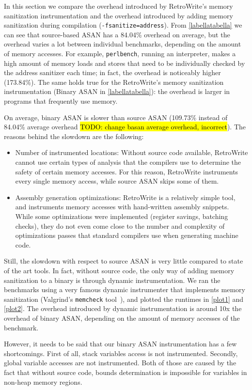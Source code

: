 \documentclass[a4paper,11pt,oneside]{report}
\newcommand{\sysname}{RetroWrite\xspace}
\DeclareRobustCommand{\todo}[1]{{\sethlcolor{cyan}\hl{TODO: #1}}}
\begin{document}
In this section we compare the overhead introduced by \sysname's memory
sanitization instrumentation and the overhead introduced by adding memory
sanitization during compilation (\texttt{-fsanitize=address}).  From
\autoref{labellatabella} we can see that source-based ASAN has a 84.04\%
overhead on average, but the overhead varies a lot between individual
benchmarks, depending on the amount of memory accesses. For example,
\texttt{perlbench}, running an interpreter, makes a high amount of memory loads
and stores that need to be individually checked by the address sanitizer each
time; in fact, the overhead is noticeably higher (173.84\%). The same holds
true for the \sysname's memory sanitization instrumentation (Binary ASAN in
\autoref{labellatabella}): the overhead is larger in programs that frequently
use memory. 

On average, binary ASAN is slower than source ASAN (109.73\% instead of 84.04\%
average overhead \todo{change basan average overhead, incorrect}). The reasons
behind the slowdown are the following:
\begin{itemize}
	\item Number of instrumented locations: Without source code available,
		\sysname cannot use certain types of analysis that the compilers use to 
		determine the safety of certain memory accesses. For this reason, \sysname
		instruments every single memory access, while source ASAN skips some of them.
	\item Assembly generation optimizations: \sysname is a relatively simple tool, 
		and instruments memory accesses with hand-written assembly snippets. While
		some optimizations were implemented (register savings, batching checks), they
		do not even come close to the number and complexity of optimizations passes that
		standard compilers use when generating machine code. 
\end{itemize}
Still, the slowdown with respect to source ASAN is very little compared to state of the art tools.
In fact, without source code, the only way of adding memory sanitization to a binary is through
dynamic instrumentation. We ran the benchmarks using a very famous dynamic instrumenter that implements
memory sanitization (Valgrind's \texttt{memcheck} tool~\cite{valgrind}), and plotted the runtimes in
\autoref{plot1} and \autoref{plot2}. The overhead introduced by dynamic instrumentation is around 10x the 
overhead of binary ASAN, depending on the amount of memory accesses of the benchmark. 

However, it needs to be said that our binary ASAN instrumentation has a few
shortcomings. First of all, stack variables access is not instrumented.
Secondly, global variable accesses are not instrumented. Both of those are
caused by the fact that without source code, bounds determination is impossible
for variables in non-heap memory regions. 
\end{document}
